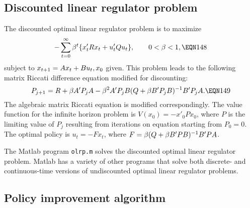 \subsection{Discounted linear regulator problem}

The discounted optimal linear
regulator problem is to maximize
$$- \sum_{t=0}^\infty \be^t \{x'_t Rx_t+u'_tQu_t\},\qquad 0<\be<1,\EQN 148$$
subject to $x_{{t+1}}=Ax_t+Bu_t,x_0$ given. This problem
leads to the following matrix Riccati difference
equation modified for discounting:
$$P_{j+1} =R+\be A'P_jA-\be^2A'P_jB(Q+\be B'P_jB)^{-1} B'P_jA.\EQN 149$$
The algebraic matrix Riccati equation is modified correspondingly.  The value
function for the infinite horizon problem is  $V(x_0)= - x'_0Px_0$, where
$P$ is the limiting value of $P_j$ resulting from iterations on equation
 starting
from $P_0=0$.  The optimal policy is $u_t=-Fx_t$, where $F={\beta} (Q+{\beta}
B'PB)^{-1} B'PA$.

  The Matlab program {\tt olrp.m} solves the discounted
optimal linear regulator problem.  Matlab has a variety
of other programs that solve both discrete- and continuous-time
 versions of undiscounted
optimal linear regulator problems.
\subsection{Policy improvement algorithm}

